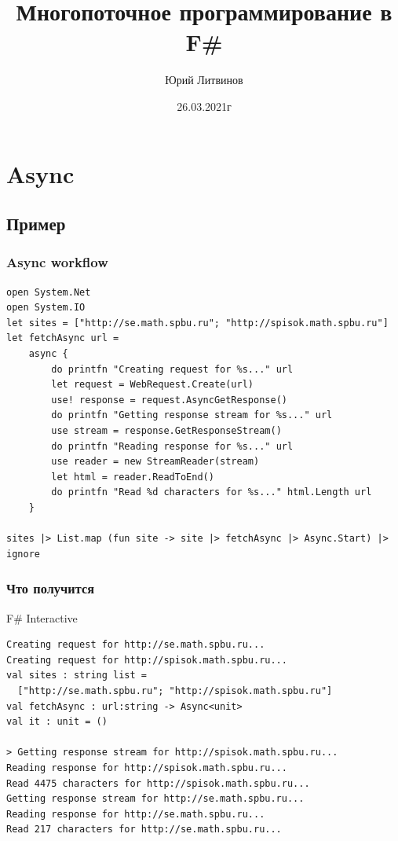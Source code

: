 \documentclass[xetex,mathserif,serif]{beamer}
\title{Многопоточное программирование в F\#}
\author{Юрий Литвинов}
\date{26.03.2021г}
\begin{document}
    
    \frame{\titlepage}

    \section{Async}

    \subsection{Пример}

    \begin{frame}[fragile]
        \frametitle{Async workflow}
        \begin{footnotesize}
            \begin{verbatim}
open System.Net
open System.IO
let sites = ["http://se.math.spbu.ru"; "http://spisok.math.spbu.ru"]
let fetchAsync url =
    async { 
        do printfn "Creating request for %s..." url
        let request = WebRequest.Create(url)
        use! response = request.AsyncGetResponse()
        do printfn "Getting response stream for %s..." url
        use stream = response.GetResponseStream()
        do printfn "Reading response for %s..." url
        use reader = new StreamReader(stream)
        let html = reader.ReadToEnd()
        do printfn "Read %d characters for %s..." html.Length url 
    }

sites |> List.map (fun site -> site |> fetchAsync |> Async.Start) |> ignore
            \end{verbatim}
        \end{footnotesize}
    \end{frame}

    \begin{frame}[fragile]
        \frametitle{Что получится}
        \begin{alertblock}{F\# Interactive}
            \begin{verbatim}
Creating request for http://se.math.spbu.ru...
Creating request for http://spisok.math.spbu.ru...
val sites : string list =
  ["http://se.math.spbu.ru"; "http://spisok.math.spbu.ru"]
val fetchAsync : url:string -> Async<unit>
val it : unit = ()

> Getting response stream for http://spisok.math.spbu.ru...
Reading response for http://spisok.math.spbu.ru...
Read 4475 characters for http://spisok.math.spbu.ru...
Getting response stream for http://se.math.spbu.ru...
Reading response for http://se.math.spbu.ru...
Read 217 characters for http://se.math.spbu.ru...
            \end{verbatim}
        \end{alertblock}
    \end{frame}
\end{document}
